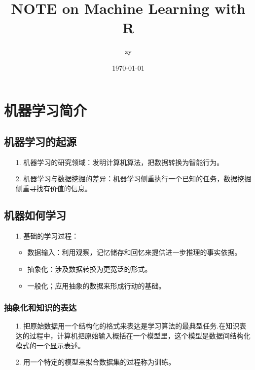 \documentclass[11pt,a4paper,oneside]{book}
\title{\huge NOTE on Machine Learning with R}
\author{zy}
\date{\today}
\begin{document}
\maketitle
\tableofcontents  %


\chapter{机器学习简介} 
\section{机器学习的起源}
\begin{enumerate}
	\item[1.]机器学习的研究领域：发明计算机算法，把数据转换为智能行为。
	\item[2.]机器学习与数据挖掘的差异：机器学习侧重执行一个已知的任务，数据挖掘侧重寻找有价值的信息。
\end{enumerate} 
\section{机器如何学习}
\begin{enumerate}
	\item[1.]基础的学习过程：
	\begin{itemize}
		\item 数据输入：利用观察，记忆储存和回忆来提供进一步推理的事实依据。
		\item 抽象化：涉及数据转换为更宽泛的形式。
		\item 一般化；应用抽象的数据来形成行动的基础。
	\end{itemize}
\end{enumerate}
\subsection{抽象化和知识的表达}
\begin{enumerate}
	\item[1.]把原始数据用一个结构化的格式来表达是学习算法的最典型任务.在知识表达的过程中，计算机把原始输入概括在一个模型里，这个模型是数据间结构化模式的一个显示表述。
	\item[2.]用一个特定的模型来拟合数据集的过程称为训练。
\end{enumerate}
\end{document}
